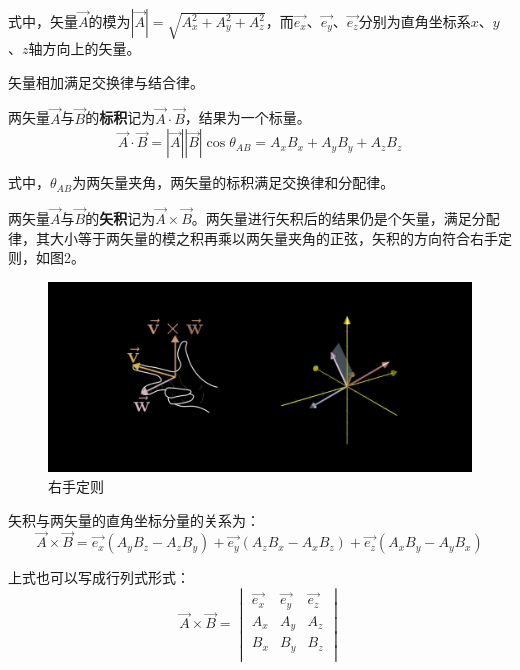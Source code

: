 \documentclass[UTF8,a4paper,11pt]{article}
\begin{document}
式中，矢量$\overrightarrow{A}$的模为$\left| \overrightarrow{A} \right|=\sqrt{A_x^2+A_y^2+A_z^2}$，而$\overrightarrow{e_x}$、$\overrightarrow{e_y}$、$\overrightarrow{e_z}$分别为直角坐标系$x$、$y$、$z$轴方向上的矢量。

矢量相加满足交换律与结合律。

两矢量$\overrightarrow{A}$与$\overrightarrow{B}$的\textbf{标积}记为$\overrightarrow{A}\cdot\overrightarrow{B}$，结果为一个标量。
\begin{equation}
\overrightarrow{A}\cdot\overrightarrow{B}=\left| \overrightarrow{A} \right| \left| \overrightarrow{B} \right| \cos\theta_{AB}=A_xB_x+A_yB_y+A_zB_z
\end{equation}

式中，$\theta_{AB}$为两矢量夹角，两矢量的标积满足交换律和分配律。

两矢量$\overrightarrow{A}$与$\overrightarrow{B}$的\textbf{矢积}记为$\overrightarrow{A}\times\overrightarrow{B}$。两矢量进行矢积后的结果仍是个矢量，满足分配律，其大小等于两矢量的模之积再乘以两矢量夹角的正弦，矢积的方向符合右手定则，如图2。
\begin{figure}[htbp]
\centering
\includegraphics[scale=0.1]{p2.jpg}
\caption{右手定则}
\end{figure}

矢积与两矢量的直角坐标分量的关系为：
\begin{equation}
\overrightarrow{A}\times\overrightarrow{B}=\overrightarrow{e_x}(A_yB_z-A_zB_y)+\overrightarrow{e_y}(A_zB_x-A_xB_z)+\overrightarrow{e_z}(A_xB_y-A_yB_x)
\end{equation}

上式也可以写成行列式形式：
\begin{equation}
\overrightarrow{A}\times\overrightarrow{B}=\begin{vmatrix}
\overrightarrow{e_x} & \overrightarrow{e_y} &\overrightarrow{e_z} \\
A_x & A_y & A_z \\
B_x & B_y & B_z \\
\end{vmatrix}
\end{equation}
\end{document}
